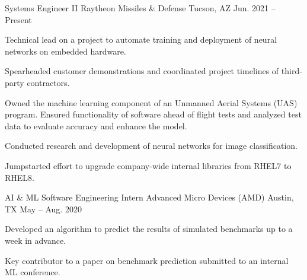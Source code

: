 

\begin{cventries}

  \cventry
    {Systems Engineer II} %
    {Raytheon Missiles \& Defense} %
    {Tucson, AZ} %
    {Jun. 2021 – Present} %
    {
      \begin{cvitems} %
        \item {Technical lead on a project to automate training and deployment of neural networks on embedded hardware.}
        \item {Spearheaded customer demonstrations and coordinated project timelines of third-party contractors.}
        \item {Owned the machine learning component of an Unmanned Aerial Systems (UAS) program. Ensured functionality of software ahead of flight tests and analyzed test data to evaluate accuracy and enhance the model.}
        \item {Conducted research and development of neural networks for image classification.}
        \item {Jumpstarted effort to upgrade company-wide internal libraries from RHEL7 to RHEL8.}
      \end{cvitems}
    }

  \cventry
    {AI \& ML Software Engineering Intern} %
    {Advanced Micro Devices (AMD)} %
    {Austin, TX} %
    {May – Aug. 2020} %
    {
      \begin{cvitems} %
        \item {Developed an algorithm to predict the results of simulated benchmarks up to a week in advance.}
        \item {Key contributor to a paper on benchmark prediction submitted to an internal ML conference.}
      \end{cvitems}
    }


\end{cventries}
